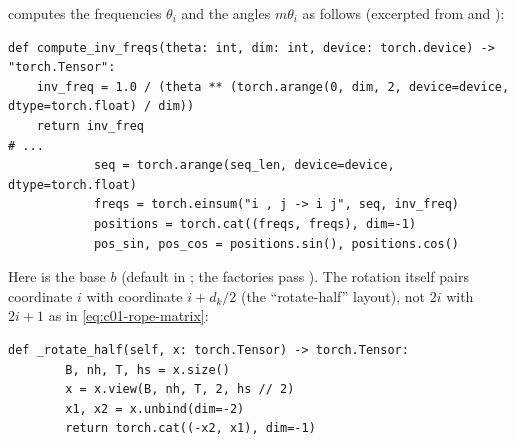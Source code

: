 \begin{implnote}[title={In the code: RoPE in OLMo-core}]
 computes the frequencies
$\theta_i$ and the angles $m\theta_i$ as follows (excerpted from 
and ):
\begin{lstlisting}[caption={Excerpt from \texttt{repos/\allowbreak allenai\_\_OLMo-core/\allowbreak src/\allowbreak olmo\_core/\allowbreak nn/\allowbreak rope.py}},label={lst:c01-olmo-rope-freq}]
def compute_inv_freqs(theta: int, dim: int, device: torch.device) -> "torch.Tensor":
    inv_freq = 1.0 / (theta ** (torch.arange(0, dim, 2, device=device, dtype=torch.float) / dim))
    return inv_freq
# ...
            seq = torch.arange(seq_len, device=device, dtype=torch.float)
            freqs = torch.einsum("i , j -> i j", seq, inv_freq)
            positions = torch.cat((freqs, freqs), dim=-1)
            pos_sin, pos_cos = positions.sin(), positions.cos()
\end{lstlisting}
Here  is the base $b$ (default  in ; the
 factories pass ). The rotation itself pairs coordinate $i$ with
coordinate $i + d_k/2$ (the ``rotate-half'' layout), not $2i$ with $2i+1$ as in
\eqref{eq:c01-rope-matrix}:
\begin{lstlisting}[caption={Excerpt from \texttt{repos/\allowbreak allenai\_\_OLMo-core/\allowbreak src/\allowbreak olmo\_core/\allowbreak nn/\allowbreak rope.py}},label={lst:c01-olmo-rope-apply}]
    def _rotate_half(self, x: torch.Tensor) -> torch.Tensor:
        B, nh, T, hs = x.size()
        x = x.view(B, nh, T, 2, hs // 2)
        x1, x2 = x.unbind(dim=-2)
        return torch.cat((-x2, x1), dim=-1)


\end{lstlisting}
\end{implnote}
